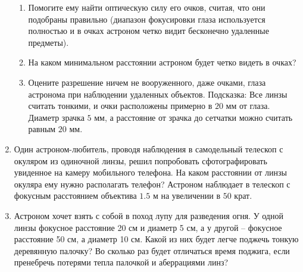 \documentclass[12pt]{article}
\begin{document}
\begin{enumerate}
\begin{enumerate}
        \item Помогите ему найти оптическую силу его очков, считая, что они подобраны правильно (диапазон фокусировки глаза используется полностью и в очках астроном четко видит бесконечно удаленные предметы).
        \item На каком минимальном расстоянии астроном будет четко видеть в очках?
        \item Оцените разрешение ничем не вооруженного, даже очками, глаза астронома при наблюдении удаленных объектов.
        Подсказка: Все линзы считать тонкими, и очки расположены примерно в $20$ мм от глаза. Диаметр зрачка $5$ мм, а расстояние от зрачка до сетчатки можно считать равным $20$ мм.
    \end{enumerate}
    \item Один астроном-любитель, проводя наблюдения в самодельный телескоп с окуляром из одиночной линзы, решил попробовать сфотографировать увиденное на камеру мобильного телефона. На каком расстоянии от линзы окуляра ему нужно располагать телефон? Астроном наблюдает в телескоп с фокусным расстоянием объектива $1.5$ м на увеличении в $50$ крат.
    \item Астроном хочет взять с собой в поход лупу для разведения огня. У одной линзы фокусное расстояние 20 см и диаметр 5 см, а у другой -- фокусное расстояние 50 см, а диаметр 10 см. Какой из них будет легче поджечь тонкую деревянную палочку? Во сколько раз будет отличаться время поджига, если пренебречь потерями тепла палочкой и аберрациями линз?
\end{enumerate}
\end{document}
